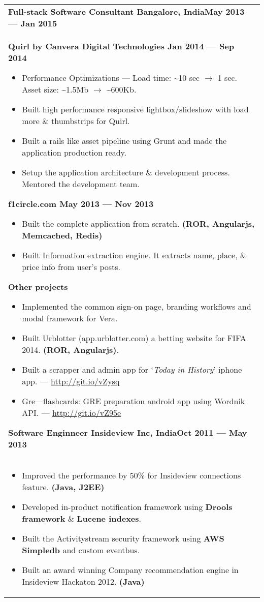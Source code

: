 \documentclass{article}
\begin{document}
\begin{tabular}{p{\dimexpr\linewidth-2\tabcolsep}}
    \bigskip
    {\bfseries Full-stack Software Consultant \hfill Bangalore, India\hfill May 2013 --- Jan 2015}\\
    \smallskip
    \bfseries \enskip{} Quirl by Canvera Digital Technologies \hfill Jan 2014 --- Sep 2014 \mdseries
    \smallskip
    \begin{itemize}
        \item Performance Optimizations --- Load time: \textasciitilde10 sec \( \rightarrow \) 1 sec. Asset size: \textasciitilde1.5Mb \( \rightarrow \) \textasciitilde600Kb.
        \item Built high performance responsive lightbox/slideshow with load more \& thumbstrips for Quirl.
        \item Built a rails like asset pipeline using Grunt and made the application production ready.
        \item Setup the application architecture \& development process. Mentored the development team.
    \end{itemize}
    \bigskip
    \bfseries \enskip{} f1circle.com \hfill May 2013 --- Nov 2013 \mdseries 
    \smallskip
    \begin{itemize}
        \item Built the complete application from scratch. \textbf{(ROR, Angularjs, Memcached, Redis)}
        \item Built Information extraction engine. It extracts name, place, \& price info from user's posts.
    \end{itemize}
    \bigskip
    \bfseries \enskip{} Other projects  \mdseries
    \smallskip
    \begin{itemize}
        \item Implemented the common sign-on page, branding workflows and modal framework for Vera.
        \item Built Urblotter (app.urblotter.com) a betting website for FIFA 2014. \textbf{(ROR, Angularjs)}.
        \item Built a scrapper and admin app for `\textit{Today in History}' iphone app. --- \url{http://git.io/vZysq}
        \item Gre---flashcards: GRE preparation android app using Wordnik API\@. --- \url{http://git.io/vZ95e}
    \end{itemize}
    \bigskip
    \smallskip

    {\bfseries Software Enginneer \hfill Insideview Inc, India\hfill Oct 2011 --- May 2013} \\
    \begin{itemize}
      \item Improved the performance by 50\% for Insideview connections feature. \textbf{(Java, J2EE)}
      \item Developed in-product notification framework using \textbf{Drools framework} \& \textbf{Lucene indexes}.
      \item Built the Activitystream security framework using \textbf{AWS Simpledb} and custom eventbus.
    \item Built an award winning Company recommendation engine in Insideview Hackaton 2012. \textbf{(Java)}
    \end{itemize}


\end{tabular}
\end{document}
